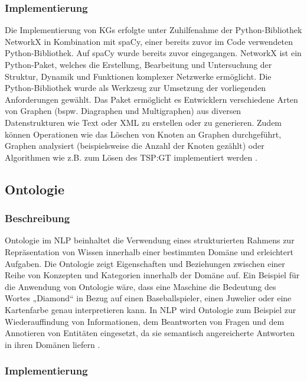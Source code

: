 \subsubsection{Implementierung}
Die Implementierung von KGs erfolgte unter Zuhilfenahme der Python-Bibliothek NetworkX in Kombination mit spaCy, einer bereits zuvor im Code verwendeten Python-Bibliothek. Auf spaCy wurde bereits zuvor eingegangen.
NetworkX ist ein Python-Paket, welches die Erstellung, Bearbeitung und Untersuchung der Struktur, Dynamik und Funktionen komplexer Netzwerke ermöglicht. Die Python-Bibliothek wurde als Werkzeug zur Umsetzung der vorliegenden Anforderungen gewählt. Das Paket ermöglicht es Entwicklern verschiedene Arten von Graphen (bspw. Diagraphen und Multigraphen) aus diversen Datenstrukturen wie Text oder XML zu erstellen oder zu generieren. Zudem können Operationen wie das Löschen von Knoten an Graphen durchgeführt, Graphen analysiert (beispielsweise die Anzahl der Knoten gezählt) oder Algorithmen wie z.B. zum Lösen des \ac{TSP:GT}  implementiert werden \cite{networkX:Docs}. 

\subsection{Ontologie}

\subsubsection{Beschreibung}
Ontologie im NLP beinhaltet die Verwendung eines strukturierten Rahmens zur Repräsentation von Wissen innerhalb einer bestimmten Domäne und erleichtert Aufgaben. Die Ontologie zeigt Eigenschaften und Beziehungen zwischen einer Reihe von Konzepten und Kategorien innerhalb der Domäne auf. Ein Beispiel für die Anwendung von Ontologie wäre, dass eine Maschine die Bedeutung des Wortes „Diamond“ in Bezug auf einen Baseballspieler, einen Juwelier oder eine Kartenfarbe genau interpretieren kann. In NLP wird Ontologie zum Beispiel zur Wiederauffindung von Informationen, dem Beantworten von Fragen und dem Annotieren von Entitäten eingesetzt, da sie semantisch angereicherte Antworten in ihren Domänen liefern \cite{Adelkhah2019The} \cite{Naderian2018Ontology}.

\subsubsection{Implementierung}

